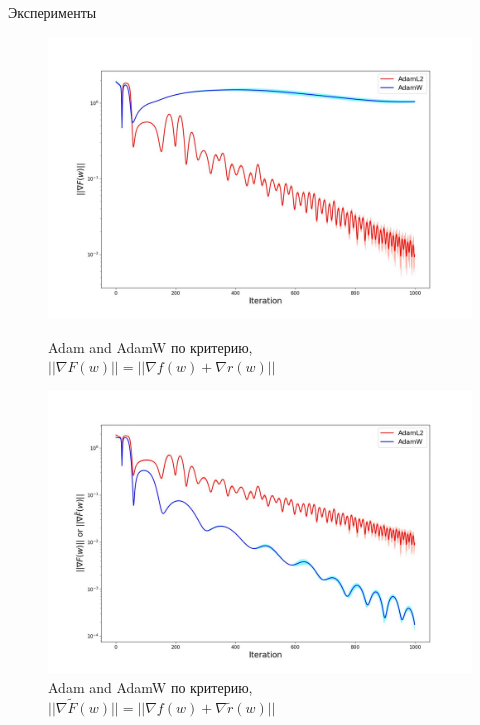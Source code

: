 \documentclass[aspectratio=169, 12pt]{beamer}
\begin{document}
\begin{frame}{Эксперименты}
\begin{figure}[H]
\begin{minipage}[h]{0.49\linewidth}
\centering
\includegraphics[width=\linewidth]{fig1.jpg}
\caption{Adam and AdamW по критерию, $||\nabla F(w)|| = ||\nabla f(w) + \nabla r(w)||$}
\label{fig:adams_errors}
\end{minipage}
\hfill
\begin{minipage}[h]{0.49\linewidth}
\includegraphics[width=\linewidth]{fig2.jpg}
\caption{Adam and AdamW по критерию, $||\nabla \tilde{F}(w)|| = ||\nabla f(w) + \nabla \tilde{r}(w)||$}
\label{fig:adams_special_errors}
\end{minipage}
\end{figure}
\end{frame}
\end{document}
